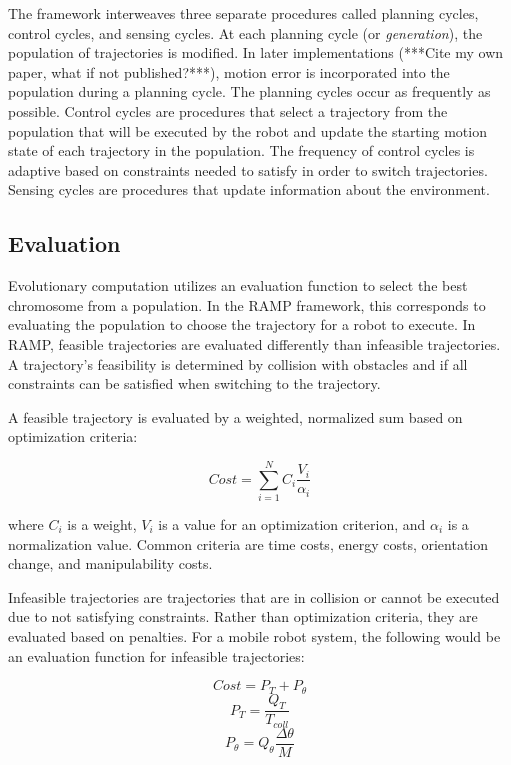 \documentclass[10pt,conference]{ieeeconf}
\begin{document}
The framework interweaves three separate procedures called planning cycles, control cycles, and sensing cycles. At each planning cycle (or \emph{generation}), the population of trajectories is modified. In later implementations (***Cite my own paper, what if not published?***), motion error is incorporated into the population during a planning cycle. The planning cycles occur as frequently as possible. Control cycles are procedures that select a trajectory from the population that will be executed by the robot and update the starting motion state of each trajectory in the population. The frequency of control cycles is adaptive based on constraints needed to satisfy in order to switch trajectories. Sensing cycles are procedures that update information about the environment.

\subsection{Evaluation}

Evolutionary computation utilizes an evaluation function to select the best chromosome from a population. In the RAMP framework, this corresponds to evaluating the population to choose the trajectory for a robot to execute. In RAMP, feasible trajectories are evaluated differently than infeasible trajectories. A trajectory's feasibility is determined by collision with obstacles and if all constraints can be satisfied when switching to the trajectory.

A feasible trajectory is evaluated by a weighted, normalized sum based on optimization criteria:

\begin{equation}
	Cost = \sum_{i=1}^{N} C_i\frac{V_i}{\alpha_i}
\end{equation}

where $C_i$ is a weight, $V_i$ is a value for an optimization criterion, and $\alpha_i$ is a normalization value. Common criteria are time costs, energy costs, orientation change, and manipulability costs.

Infeasible trajectories are trajectories that are in collision or cannot be executed due to not satisfying constraints. Rather than optimization criteria, they are evaluated based on penalties. For a mobile robot system, the following would be an evaluation function for infeasible trajectories:

\begin{equation}
Cost = P_T + P_\theta
\end{equation}
\begin{equation}
P_T = \frac{Q_T}{T_{coll}}
\end{equation}
\begin{equation}
P_\theta = Q_\theta\frac{\Delta\theta}{M}
\end{equation}
\end{document}
